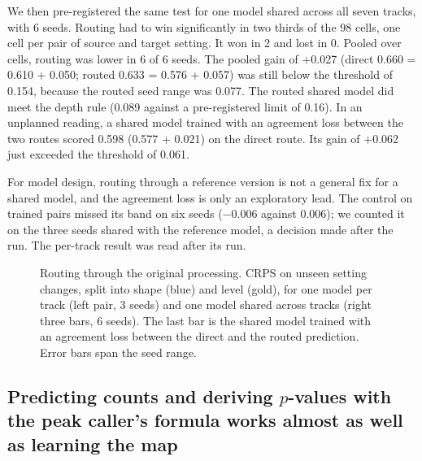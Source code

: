 \documentclass[pdflatex,sn-mathphys-num]{sn-jnl}
\newcommand{\lit}[1]{#1}
\newcommand{\nCellWin}{2}
\newcommand{\nCellWorse}{0}
\newcommand{\nCells}{98}
\newcommand{\nOneBar}{0.006}
\newcommand{\nOneGap}{\ensuremath{-}0.006}
\newcommand{\nSeedAll}{6}
\newcommand{\nSeedPos}{6}
\newcommand{\pAg}{0.598}
\newcommand{\pAgBar}{0.061}
\newcommand{\pAgGain}{\ensuremath{+}0.062}
\newcommand{\pAgOS}{0.577}
\newcommand{\pAgSE}{0.021}
\newcommand{\pCh}{0.633}
\newcommand{\pChOS}{0.576}
\newcommand{\pChS}{0.077}
\newcommand{\pChSE}{0.057}
\newcommand{\pDir}{0.660}
\newcommand{\pDirOS}{0.610}
\newcommand{\pDirSE}{0.050}
\newcommand{\pGain}{\ensuremath{+}0.027}
\newcommand{\pGainBar}{0.154}
\newcommand{\pLawCh}{0.089}
\begin{document}
We then pre-registered the same test for one model shared across all seven tracks, with
\lit{6} seeds. Routing had to win significantly in two thirds of the \nCells{} cells, one cell
per pair of source and target setting. It won in \nCellWin{} and lost in \nCellWorse{}. Pooled
over cells, routing was lower in \nSeedPos{} of \nSeedAll{} seeds. The pooled gain of \pGain{}
(direct \pDir{} = \pDirOS{} + \pDirSE{}; routed \pCh{} = \pChOS{} + \pChSE{}) was still below
the threshold of \pGainBar{}, because the routed seed range was \pChS{}. The routed shared model
did meet the depth rule (\pLawCh{} against a pre-registered limit of \lit{0.16}). In an
unplanned reading, a shared model trained with an agreement loss between the two routes
scored \pAg{} (\pAgOS{} + \pAgSE{}) on the direct route. Its gain of \pAgGain{} just exceeded
the threshold of \pAgBar{}.

For model design, routing through a reference version is not a general fix for a shared model,
and the agreement loss is only an exploratory lead. The control on trained pairs missed its
band on six seeds (\nOneGap{} against \nOneBar{}); we counted it on the three seeds shared with
the reference model, a decision made after the run. The per-track result was read after its
run.

\begin{figure}[t]
\centering
{}
\caption{Routing through the original processing. CRPS on unseen setting changes, split into
shape (blue) and level (gold), for one model per track (left pair, \lit{3} seeds) and one model
shared across tracks (right three bars, \lit{6} seeds). The last bar is the shared model
trained with an agreement loss between the direct and the routed prediction. Error bars span
the seed range.}\label{fig:route}
\end{figure}

\subsection{Predicting counts and deriving \texorpdfstring{$p$}{p}-values with the peak caller's formula works almost as well as learning the map}\label{sec:r9}
\end{document}
